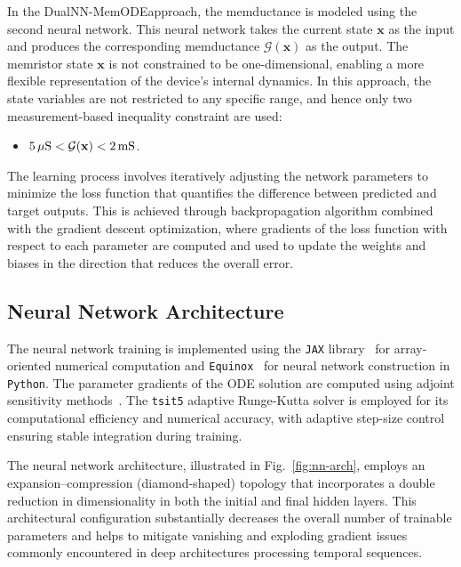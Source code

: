 \documentclass[a4,journal]{IEEEtran}
\newcommand{\Gm}{\mathcal{G}} %
\newcommand{\mS}{\,{\rm mS}}
\newcommand{\muS}{\,{\rm \mu S}}
\newcommand{\MemODETwo}{DualNN-MemODE}
\begin{document}
In the \MemODETwo approach, the  memductance is modeled using the second neural network. This neural network takes the current state \(\mathbf{x}\) as the input and produces the corresponding memductance \(\Gm(\mathbf{x})\) as the output. The memristor state \(\mathbf{x}\) is not constrained to be one-dimensional, enabling a more flexible representation of the device’s internal dynamics.
In this approach, the state variables are not restricted to any specific range, and hence only two measurement-based inequality constraint are used: 
\begin{itemize}
\item \(5\muS<\Gm(\mathbf{x})<2\mS\).
\end{itemize}

The learning process involves iteratively adjusting the network parameters to minimize the loss function that quantifies the difference between predicted and target outputs. This is  achieved through backpropagation algorithm combined with the gradient descent optimization, where gradients of the loss function with respect to each parameter are computed and used to update the weights and biases in the direction that reduces the overall error.

\subsection{Neural Network Architecture}
\label{sec:nn_architecture}
\noindent The neural network training is implemented using the \texttt{JAX} library~\cite{jax2018github} for array-oriented numerical computation and \texttt{Equinox}~\cite{kidger2021equinox} for neural network construction in \texttt{Python}. The parameter gradients of the ODE solution are computed using adjoint sensitivity methods~\cite{ Ricky2018}. The \texttt{tsit5} adaptive Runge-Kutta solver is employed for its computational efficiency and numerical accuracy, with adaptive step-size control ensuring stable integration during training.


The neural network architecture, illustrated in Fig.~\ref{fig:nn-arch}, employs an expansion–compression (diamond-shaped) topology that incorporates a double reduction in dimensionality in both the initial and final hidden layers.
This architectural configuration substantially decreases the overall number of trainable parameters and helps to mitigate vanishing and exploding gradient issues commonly encountered in deep architectures processing temporal sequences.
\end{document}
